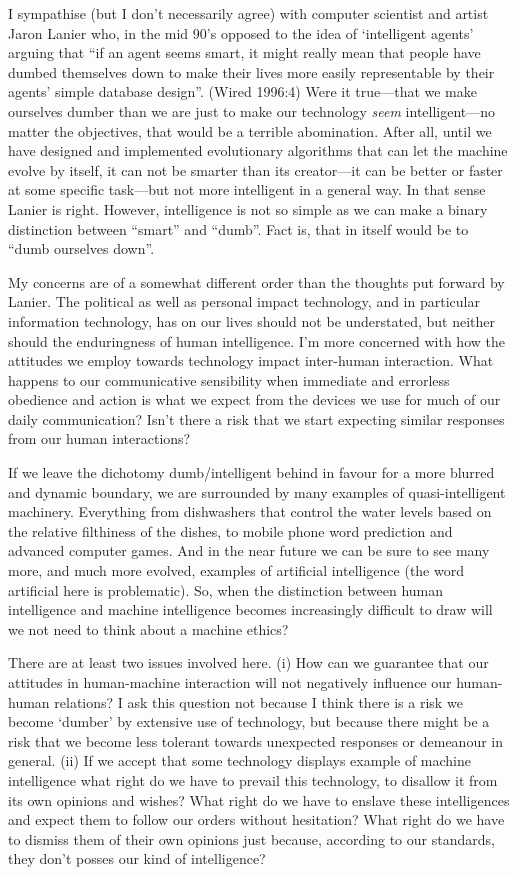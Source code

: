 I sympathise (but I don't necessarily agree) with computer scientist
and artist Jaron Lanier who, in the mid 90's opposed to the idea of
`intelligent agents' arguing that ``if an agent seems smart, it
might really mean that people have dumbed themselves down to make
their lives more easily representable by their agents' simple database
design''. (Wired 1996:4) Were it true---that we make
ourselves dumber than we are just to make our technology \emph{seem}
intelligent---no matter the objectives, that would be a terrible
abomination. After all, until we have designed and implemented evolutionary
algorithms that can let the machine evolve by itself, it can
not be smarter than its creator---it can be better or faster at some
specific task---but not more intelligent in a general way. In that
sense Lanier is right. However, intelligence is not so simple as we
can make a binary distinction between ``smart'' and ``dumb''. Fact is,
that in itself would be to ``dumb ourselves down''.

My concerns are of a somewhat different order than the thoughts put
forward by Lanier. The political as well as personal impact
technology, and in particular information technology, has on our lives
should not be understated, but neither should the enduringness of
human intelligence. I'm more concerned with how the attitudes we
employ towards technology impact inter-human
interaction. What happens to our communicative sensibility when
immediate and errorless obedience and action is what we expect from
the devices we use for much of our daily communication? Isn't there a
risk that we start expecting similar responses from our human
interactions?



If we leave the dichotomy dumb/intelligent behind in favour for a more
blurred and dynamic boundary, we are surrounded by many examples of
quasi-intelligent machinery. Everything from dishwashers that control
the water levels based on the relative filthiness of the dishes, to
mobile phone word prediction and advanced computer games. And in
the near future we can be sure to see many more, and much more
evolved, examples of artificial intelligence (the word artificial here
is problematic). So, when the distinction between human intelligence
and machine intelligence becomes increasingly difficult to draw will
we not need to think about a machine ethics?

There are at least two issues involved here. (i) How can we guarantee
that our attitudes in human-machine interaction will not negatively
influence our human-human relations? I ask this question not because I
think there is a risk we become `dumber' by extensive use of
technology, but because there might be a risk that we become less
tolerant towards unexpected responses or demeanour in general. (ii) If
we accept that some technology displays example of machine
intelligence what right do we have to prevail this technology, to disallow
it from its own opinions and wishes? What right do we have to enslave
these intelligences and expect them to follow our orders without
hesitation?  What right do we have to dismiss them of their own
opinions just because, according to our standards, they don't posses
our kind of intelligence?

